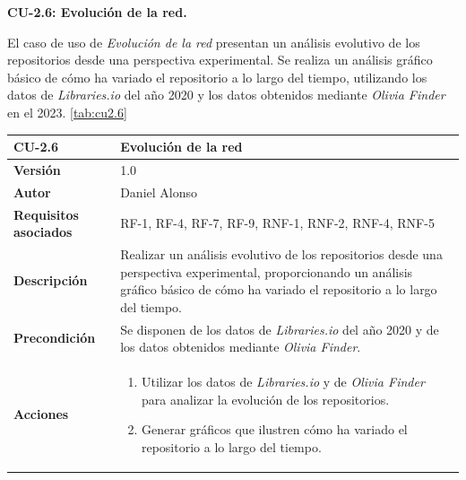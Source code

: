 \textbf{CU-2.6: Evolución de la red.}

El caso de uso de \textit{Evolución de la red} presentan un análisis evolutivo de los repositorios
desde una perspectiva experimental. Se realiza un análisis gráfico
básico de cómo ha variado el repositorio a lo largo del tiempo, utilizando los datos
de \textit{Libraries.io}\cite{jeremy_katz_2020_3626071} del año 2020 y los datos obtenidos mediante \textit{Olivia Finder} en el 2023. \ref{tab:cu2.6}


\begin{table}[p]
	\centering
	\begin{tabularx}{\linewidth}{ p{} p{} }
		\toprule
		\textbf{CU-2.6}               & \textbf{Evolución de la red}                                                                                                                                                              \\
		\toprule
		\textbf{Versión}              & 1.0                                                                                                                                                                                       \\
		\textbf{Autor}                & Daniel Alonso                                                                                                                                                                             \\
		\textbf{Requisitos asociados} & RF-1, RF-4, RF-7, RF-9, RNF-1, RNF-2, RNF-4, RNF-5                                                                                                                                        \\
		\textbf{Descripción}          & Realizar un análisis evolutivo de los repositorios desde una perspectiva experimental, proporcionando un análisis gráfico básico de cómo ha variado el repositorio a lo largo del tiempo. \\
		\textbf{Precondición}         & Se disponen de los datos de \textit{Libraries.io} del año 2020 y de los datos obtenidos mediante \textit{Olivia Finder}.                                                                  \\
		\textbf{Acciones}             & \begin{enumerate}
			                                \item Utilizar los datos de \textit{Libraries.io} y de \textit{Olivia Finder} para analizar la evolución de los repositorios.
			                                \item Generar gráficos que ilustren cómo ha variado el repositorio a lo largo del tiempo.

\end{enumerate}
\end{tabularx}
\end{table}

